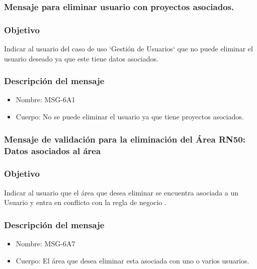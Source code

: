 \subsubsection{Mensaje para eliminar usuario con proyectos asociados.}\label{MSG-6A1}

\subsubsection{Objetivo}
Indicar al usuario del caso de uso `Gestión de Usuarios` que no puede eliminar el usuario deseado ya que este tiene datos asociados.

\subsubsection{Descripción del mensaje}
\begin{itemize}
\item Nombre: MSG-6A1
\item Cuerpo: No se puede eliminar el usuario ya que tiene proyectos asociados.
\end{itemize}


\subsubsection{Mensaje de validación para la eliminación del Área RN50: Datos asociados al área} \label{MSG-6A7}
 
 \subsubsection{Objetivo}
 Indicar al usuario que el área que desea eliminar se encuentra asociada a un Usuario y entra en conflicto con la regla de negocio .

 \subsubsection{Descripción del mensaje}
 \begin{itemize}
 \item Nombre: MSG-6A7
 \item Cuerpo: El área que desea eliminar esta asociada con uno o varios usuarios.
 \end{itemize}


